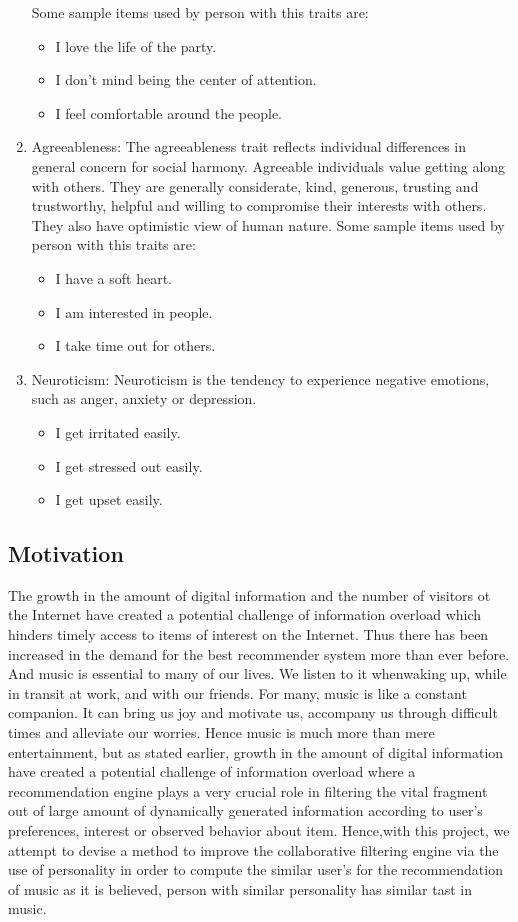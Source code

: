 \begin{enumerate}
Some sample items used by person with this traits are:
\begin{itemize}
	\item I love the life of the party.
	\item I don't mind being the center of attention.
	\item I feel comfortable around the people.
\end{itemize}
\item Agreeableness: The agreeableness trait reflects individual differences in general concern for social harmony. Agreeable individuals value getting along with others. They are generally considerate, kind, generous, trusting and trustworthy, helpful and willing to compromise their interests with others. They also have optimistic view of human nature.
Some sample items used by person with this traits are:
\begin{itemize}
	\item I have a soft heart.
	\item I am interested in people.
	\item I take time out for others.
\end{itemize}
\item Neuroticism: Neuroticism is the tendency to experience negative emotions, such as anger, anxiety or depression.
\begin{itemize}
	\item I get irritated easily.
	\item I get stressed out easily.
	\item I get upset easily.
\end{itemize}
\end{enumerate}
\subsection{Motivation}
The growth in the amount of digital information and the number of visitors ot the Internet have created a potential challenge of information overload which hinders timely access to items of interest on the Internet. Thus there has been increased in the demand for the best recommender system more than ever before. And music is essential to many of our lives. We listen to it whenwaking up, while in transit at work, and with our friends. For many, music is like a constant companion. It can bring us joy and motivate us, accompany us through difficult times and alleviate our worries. Hence music is much more than mere entertainment, but as stated earlier, growth in the amount of digital information have created a potential challenge of information overload where a recommendation engine plays a very crucial role in filtering the vital fragment out of large amount of dynamically generated information according to user's preferences, interest or observed behavior about item. 
Hence,with this project, we attempt to devise a method to improve the collaborative filtering engine via the use of personality in order to compute the similar user's for the recommendation of music as it is believed, person with similar personality has similar tast in music. 

